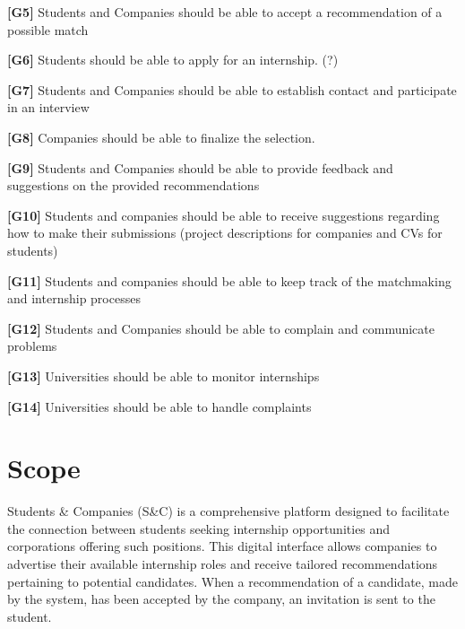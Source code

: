 \textbf{[G5]} Students and Companies should be able to accept a recommendation of a possible match

\textbf{[G6]} Students should be able to apply for an internship. (?)

\textbf{[G7]} Students and Companies should be able to establish contact and participate in an interview

\textbf{[G8]} Companies should be able to finalize the selection.

\textbf{[G9]} Students and Companies should be able to provide feedback and suggestions on the provided recommendations 

\textbf{[G10] }Students and companies should be able to receive suggestions regarding how to make their submissions (project descriptions for companies and CVs for students)

\textbf{[G11]} Students and companies should be able to keep track of the matchmaking and internship processes

\textbf{[G12]} Students and Companies should be able to complain and communicate problems

\textbf{[G13]} Universities should be able to monitor internships

\textbf{[G14]} Universities should be able to handle complaints










\section{Scope}  
Students \& Companies (S\&C) is a comprehensive platform designed to facilitate the connection between students seeking internship opportunities and corporations offering such positions. This digital interface allows companies to advertise their available internship roles and receive tailored recommendations pertaining to potential candidates. When a recommendation of a candidate, made by the system, has been accepted by the company, an invitation is sent to the student.

